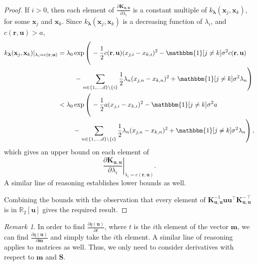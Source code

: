 \documentclass{article}
\theoremstyle{definition}
\theoremstyle{remark}
\newtheorem*{remark}{Remark}
\newcommand{\Kuu}{\mathbf{K}_{\mathbf{u},\mathbf{u}}}
\begin{document}
\begin{proof}
  If $i > 0$, then each element of $\frac{\partial \Kuu}{\partial
    \lambda_i}$ is a constant multiple of $k_{\bm\lambda}(\mathbf{x}_j,
  \mathbf{x}_k)$, for some $\mathbf{x}_j$ and $\mathbf{x}_k$. Since
  $k_{\bm\lambda}(\mathbf{x}_j, \mathbf{x}_k)$ is a decreasing function of
  $\lambda_i$, and $c(\mathbf{r}, \mathbf{u}) > a$,
  \[
    \begin{split}
      k_{\bm\lambda}(\mathbf{x}_j, \mathbf{x}_k)|_{\lambda_i = 
        c(\mathbf{r}, \mathbf{u})} &=
      \begin{multlined}[t]
        \lambda_0 \exp \left( \vphantom{\sum_{n \in \{ \} \setminus}}
        \right. -\frac{1}{2}c(\mathbf{r}, \mathbf{u})(x_{j,i} - x_{k,i})^2 -
        \mathbbm{1}[j \ne k]\sigma^2c(\mathbf{r}, \mathbf{u}) \\
        - \left. \sum_{n \in \{ 1, \dots, d \} \setminus \{ i \}}
          \frac{1}{2} \lambda_n(x_{j,n} - x_{k,n})^2 + \mathbbm{1}[j \ne
          k]\sigma^2 \lambda_n \right)
      \end{multlined} \\
      &<
      \begin{multlined}[t]
        \lambda_0 \exp \left( \vphantom{\sum_{n \in \{ \} \setminus}}
        \right. -\frac{1}{2}a(x_{j,i} - x_{k,i})^2 -
        \mathbbm{1}[j \ne k]\sigma^2a \\
        - \left. \sum_{n \in \{ 1, \dots, d \} \setminus \{ i \}}
          \frac{1}{2} \lambda_n(x_{j,n} - x_{k,n})^2 + \mathbbm{1}[j \ne
          k]\sigma^2 \lambda_n \right),
      \end{multlined}
    \end{split}
  \]
  which gives an upper bound on each element of
  \[
    \left. \frac{\partial \Kuu}{\partial \lambda_i} \right|_{\lambda_i =
      c(\mathbf{r}, \mathbf{u})}.
  \]
  A similar line of reasoning establishes lower bounds as well.

  Combining the bounds with the observation that
  every element of
  $\Kuu^{-1}\mathbf{u}\mathbf{u}^\intercal\Kuu^{-\intercal}$ is in
  $\mathbb{R}_2[\mathbf{u}]$ gives the required result.
\end{proof}

\begin{remark}
  In order to find $\frac{\partial q(\mathbf{u})}{\partial t}$,
  where $t$ is the $i$th element of the vector $\mathbf{m}$, we can
  find $\frac{\partial q(\mathbf{u})}{\partial \mathbf{m}}$ and simply take the
  $i$th element. A similar line of reasoning applies to matrices as well. Thus,
  we only need to consider derivatives with respect to $\mathbf{m}$ and
  $\mathbf{S}$.
\end{remark}
\end{document}

